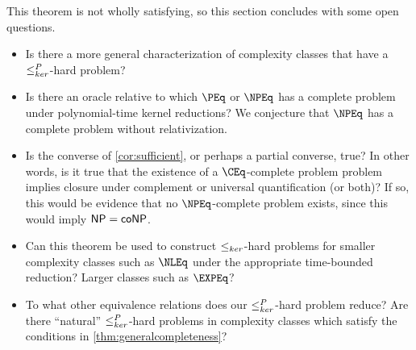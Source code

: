 This theorem is not wholly satisfying, so this section concludes with some open questions.
\begin{itemize}
\item Is there a more general characterization of complexity classes that have a $\leq^{P}_{ker}$-hard problem?
\item
  Is there an oracle relative to which $\PEq$ or $\NPEq$ has a complete problem under polynomial-time kernel reductions?
  We conjecture that $\NPEq$ has a complete problem without relativization.
\item
  Is the converse of \autoref{cor:sufficient}, or perhaps a partial converse, true?
  In other words, is it true that the existence of a $\CEq$-complete problem problem implies closure under complement or universal quantification (or both)?
  If so, this would be evidence that no $\NPEq$-complete problem exists, since this would imply ${\mathsf{NP}} = {\mathsf{coNP}}$.
\item
  Can this theorem be used to construct $\leq_{ker}$-hard problems for smaller complexity classes such as $\NLEq$ under the appropriate time-bounded reduction?
  Larger classes such as $\EXPEq$?
\item
  To what other equivalence relations does our $\leq^{P}_{ker}$-hard problem reduce?
  Are there ``natural'' $\leq^{P}_{ker}$-hard problems in complexity classes which satisfy the conditions in \autoref{thm:generalcompleteness}?
\end{itemize}

